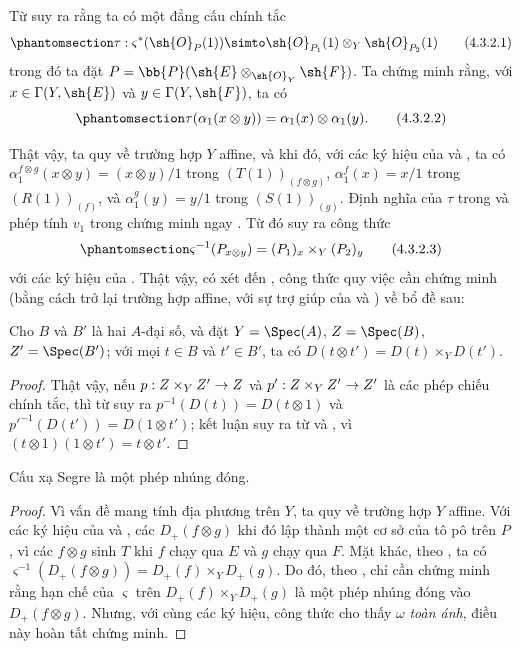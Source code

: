\documentclass[oneside,10pt]{amsart}
\makeatletter
\newcommand{\ega@arrow}[2]{\mathchoice{#1}{#2}{#2}{#2}}
\renewcommand{\to}{\ega@arrow{\longrightarrow}{\rightarrow}}
\let\EGAOriginalLabel\label
\renewcommand{\label}[1]{\phantomsection\EGAOriginalLabel{#1}}
\makeatother
\begin{document}
\begin{env}[4.3.2]
\label{II.4.3.2}
Từ  suy ra rằng ta có một đẳng cấu chính tắc
\[
\label{II.4.3.2.1}
  \tau:\varsigma^*(\sh{O}_P(1))\simto\sh{O}_{P_1}(1)\otimes_Y\sh{O}_{P_2}(1)
  \tag{4.3.2.1}
\]
trong đó ta đặt $P=\bb{P}(\sh{E}\otimes_{\sh{O}_Y}\sh{F})$.
Ta chứng minh rằng, với $x\in\Gamma(Y,\sh{E})$ và $y\in\Gamma(Y,\sh{F})$, ta có
\[
\label{II.4.3.2.2}
  \tau(\alpha_1(x\otimes y))=\alpha_1(x)\otimes\alpha_1(y).
  \tag{4.3.2.2}
\]

Thật vậy, ta quy về trường hợp $Y$ affine, và khi đó, với các ký hiệu của  và , ta có $\alpha_1^{f\otimes g}(x\otimes y)=(x\otimes y)/1$ trong $(T(1))_{(f\otimes g)}$, $\alpha_1^f(x)=x/1$ trong $(R(1))_{(f)}$, và $\alpha_1^g(y)=y/1$ trong $(S(1))_{(g)}$.
Định nghĩa của $\tau$ trong  và phép tính $v_1$ trong  chứng minh ngay .
Từ đó suy ra công thức
\[
\label{II.4.3.2.3}
  \varsigma^{-1}(P_{x\otimes y})=(P_1)_x\times_Y(P_2)_y
  \tag{4.3.2.3}
\]
với các ký hiệu của .
Thật vậy, có xét đến , công thức  quy việc cần chứng minh (bằng cách trở lại trường hợp affine, với sự trợ giúp của  và ) về bổ đề sau:

\begin{lemma}[4.3.2.4]
\label{II.4.3.2.4}
Cho $B$ và $B'$ là hai $A$-đại số, và đặt $Y=\Spec(A)$, $Z=\Spec(B)$, $Z'=\Spec(B')$;
với mọi $t\in B$ và $t'\in B'$, ta có $D(t\otimes t')=D(t)\times_YD(t')$.
\end{lemma}

\begin{proof}
Thật vậy, nếu $p:Z\times_YZ'\to Z$ và $p':Z\times_YZ'\to Z'$ là các phép chiếu chính tắc, thì từ  suy ra $p^{-1}(D(t))=D(t\otimes1)$ và ${p'}^{-1}(D(t'))=D(1\otimes t')$;
kết luận suy ra từ  và , vì $(t\otimes1)(1\otimes t')=t\otimes t'$.
\end{proof}
\end{env}

\begin{proposition}[4.3.3]
\label{II.4.3.3}
Cấu xạ Segre là một phép nhúng đóng.
\end{proposition}

\begin{proof}
Vì vấn đề mang tính địa phương trên $Y$, ta quy về trường hợp $Y$ affine.
Với các ký hiệu của  và , các $D_+(f\otimes g)$ khi đó lập thành một cơ sở của tô pô trên $P$, vì các $f\otimes g$ sinh $T$ khi $f$ chạy qua $E$ và $g$ chạy qua $F$.
Mặt khác, theo , ta có $\varsigma^{-1}(D_+(f\otimes g))=D_+(f)\times_YD_+(g)$.
Do đó, theo , chỉ cần chứng minh rằng hạn chế của $\varsigma$ trên $D_+(f)\times_YD_+(g)$ là một phép nhúng đóng vào $D_+(f\otimes g)$.
Nhưng, với cùng các ký hiệu, công thức  cho thấy $\omega$ \emph{toàn ánh}, điều này hoàn tất chứng minh.
\end{proof}
\end{document}
